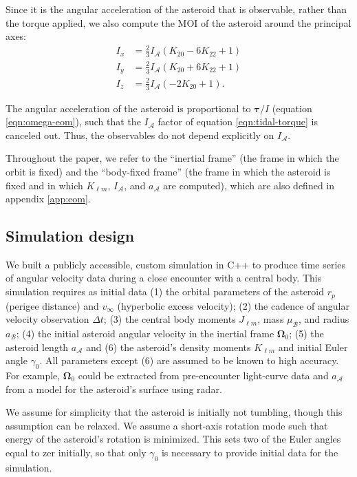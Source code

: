 \documentclass[fleqn,usenatbib]{mnras}
\newcommand{\parens}[1]{\left( #1 \right)}
\begin{document}
Since it is the angular acceleration of the asteroid that is observable, rather than the torque applied, we also compute the MOI of the asteroid around the principal axes: 
\begin{equation}
  \begin{split}
    I_x &= \frac{2}{3} I_\mathcal{A} \parens{K_{20} - 6 K_{22} + 1}\\
    I_y &= \frac{2}{3} I_\mathcal{A} \parens{K_{20} + 6 K_{22} + 1}\\
    I_z &= \frac{2}{3} I_\mathcal{A} \parens{-2K_{20} + 1}.
  \end{split}
  \label{eqn:moi}
\end{equation}

The angular acceleration of the asteroid is proportional to $\bm \tau / I$ (equation \ref{eqn:omega-eom}), such that the $I_\mathcal{A}$ factor of equation \ref{eqn:tidal-torque} is canceled out. Thus, the observables do not depend explicitly on $I_\mathcal{A}$.

Throughout the paper, we refer to the ``inertial frame'' (the frame in which the orbit is fixed) and the ``body-fixed frame'' (the frame in which the asteroid is fixed and in which $K_{\ell m}$, $I_\mathcal{A}$, and $a_\mathcal{A}$ are computed), which are also defined in appendix \ref{app:eom}.

\subsection{Simulation design}
\label{sec:sim}

We built a publicly accessible, custom simulation in C++ to produce time series of angular velocity data during a close encounter with a central body. This simulation requires as initial data (1) the orbital parameters of the asteroid $r_p$ (perigee distance) and $v_\infty$ (hyperbolic excess velocity); (2) the cadence of angular velocity observation $\Delta t$; (3) the central body moments $J_{\ell m}$, mass $\mu_\mathcal{B}$, and radius $a_\mathcal{B}$; (4) the initial asteroid angular velocity in the inertial frame $\bm \Omega_0$; (5) the asteroid length $a_\mathcal{A}$ and (6) the asteroid's density moments $K_{\ell m}$ and initial Euler angle $\gamma_0$. All parameters except (6) are assumed to be known to high accuracy. For example, $\bm \Omega_0$ could be extracted from pre-encounter light-curve data and $a_\mathcal{A}$ from a model for the asteroid's surface using radar.

We assume for simplicity that the asteroid is initially not tumbling, though this assumption can be relaxed. We assume a short-axis rotation mode such that energy of the asteroid's rotation is minimized. This sets two of the Euler angles equal to zer initially, so that only $\gamma_0$ is necessary to provide initial data for the simulation.
\end{document}
